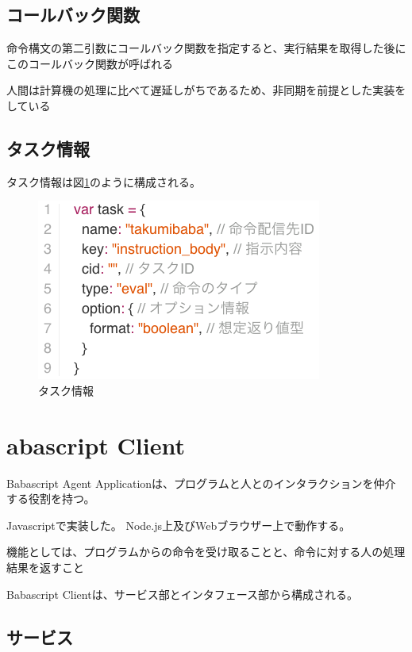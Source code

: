\subsection{コールバック関数}\label{ux30b3ux30fcux30ebux30d0ux30c3ux30afux95a2ux6570}

命令構文の第二引数にコールバック関数を指定すると、実行結果を取得した後にこのコールバック関数が呼ばれる

人間は計算機の処理に比べて遅延しがちであるため、非同期を前提とした実装をしている

\subsection{タスク情報}\label{ux30bfux30b9ux30afux60c5ux5831}

タスク情報は図\ref{fig:task_format}のように構成される。

\begin{figure}[htbp]
  \begin{center}
  \includegraphics[width=.6\linewidth,bb=0 0 354 225]{images/task_format.js.png}
  \end{center}
  \caption{タスク情報}
  \label{fig:task_format}
\end{figure}

\section{abascript Client}\label{abascript-client}

Babascript Agent
Applicationは、プログラムと人とのインタラクションを仲介する役割を持つ。

Javascriptで実装した。 Node.js上及びWebブラウザー上で動作する。

機能としては、プログラムからの命令を受け取ることと、命令に対する人の処理結果を返すこと

Babascript Clientは、サービス部とインタフェース部から構成される。

\subsection{サービス}\label{ux30b5ux30fcux30d3ux30b9}

